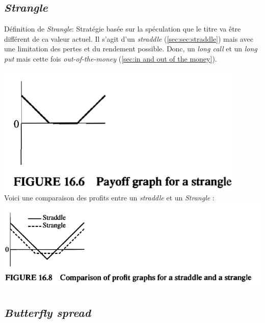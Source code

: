 \documentclass[11pt,french]{report}
\begin{document}
\subsection{\emph{Strangle}}
\label{sec:sec:strangle}

Définition de \emph{Strangle}: Stratégie basée sur la spéculation que le titre va être différent de ca valeur actuel. Il s'agit d'un \emph{straddle} (\ref{sec:sec:straddle}) mais avec une limitation des pertes et du rendement possible. Donc, un \emph{long call} et un \emph{long put} mais cette fois \emph{out-of-the-money} (\ref{sec:in and out of the money}).

\includegraphics[scale=0.44]{picture28.PNG}
\\
Voici une comparaison des profits entre un \emph{straddle} et un \emph{Strangle} :
\\
\includegraphics[scale=0.44]{picture29.PNG}

\subsection{\emph{Butterfly spread}}
\label{sec:sec:buttefly spread}
\end{document}
